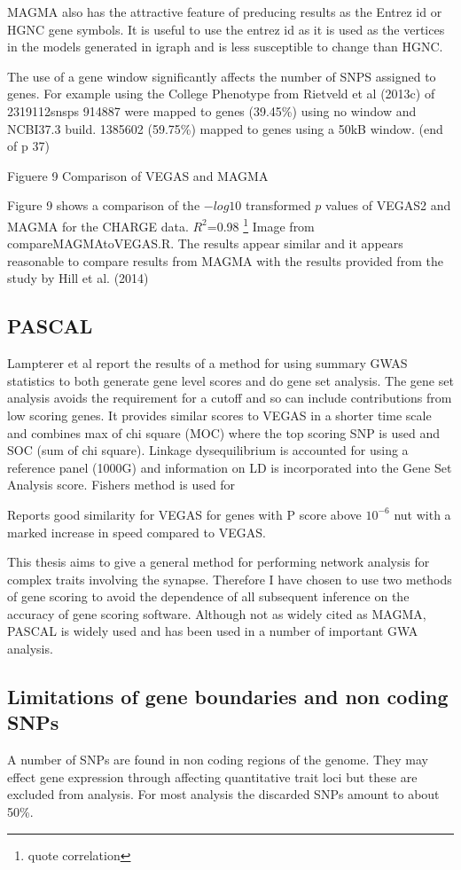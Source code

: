MAGMA also has the attractive feature of preducing results as the Entrez id or HGNC gene symbols. It is useful to use the entrez id as it is used as the vertices in the models generated in igraph and is less susceptible to change than HGNC.

The use of a gene window significantly affects the number of SNPS assigned to genes. For example using the College Phenotype from Rietveld et al (2013c) of 2319112snsps 914887 were mapped to genes (39.45\%) using no window and NCBI37.3 build. 1385602 (59.75\%) mapped to genes using a 50kB window. (end of p 37)
 
Figuere 9 Comparison of VEGAS and MAGMA

Figure 9 shows a comparison of the $-log10$ transformed $p$ values of VEGAS2 and MAGMA for the CHARGE data. $R^2$=0.98 \footnote{quote correlation} Image from compareMAGMAtoVEGAS.R. The results appear similar and it appears reasonable to compare results from MAGMA with the results provided from the study by Hill et al. (2014)
\subsection{PASCAL}
Lampterer et al \cite{lamparter2016fast} report the results of a method for using summary GWAS statistics to both generate gene level scores and do gene set analysis. The gene set analysis avoids the requirement for a cutoff and so can include contributions from low scoring genes. It provides similar scores to VEGAS in a shorter time scale and combines max of chi square (MOC) where the top scoring SNP is used and SOC (sum of chi square). Linkage dysequilibrium is accounted for using a reference panel (1000G) and information on LD is incorporated into the Gene Set Analysis score. Fishers method is used for 

Reports good similarity for VEGAS for genes with P score above $10^{-6}$ nut with a marked increase in speed compared to VEGAS.

This thesis aims to give a general method for performing network analysis for complex traits involving the synapse. Therefore I have chosen to use two methods of gene scoring to avoid the dependence of all subsequent inference on the accuracy of gene scoring software. Although not as widely cited as MAGMA, PASCAL is widely used and has been used in a number of important GWA analysis.   

\subsection{Limitations of gene boundaries and non coding SNPs}
A number of SNPs are found in non coding regions of the genome. They may effect gene expression through affecting quantitative trait loci but these are excluded from analysis. For most analysis the discarded SNPs amount to about 50\%.

